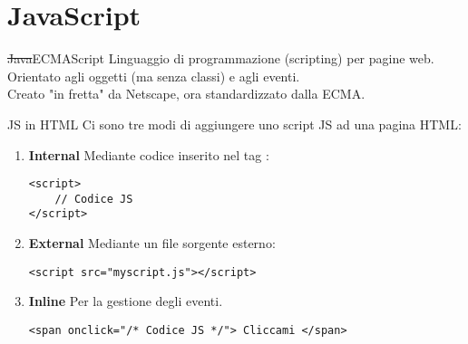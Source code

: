 \section{JavaScript}
\begin{frame}[fragile]{\sout{Java}ECMAScript}\transfade\centering
  Linguaggio di programmazione (scripting) per pagine web.\\\bigskip\pause
  Orientato agli oggetti (ma senza classi) e agli eventi.\\\bigskip\pause
  Creato "in fretta" da Netscape, ora standardizzato dalla ECMA.\\
\end{frame}

\begin{frame}[fragile]{JS in HTML}\transfade\centering
  Ci sono tre modi di aggiungere uno script JS ad una pagina HTML:
  \begin{enumerate}[<+(1)->]
    \item \textbf{Internal} Mediante codice inserito nel tag :
    \begin{verbatim}
<script>
    // Codice JS
</script>
    \end{verbatim}
    \item \textbf{External} Mediante un file sorgente esterno:
    \begin{verbatim}
<script src="myscript.js"></script>
    \end{verbatim}
    \item \textbf{Inline} Per la gestione degli eventi.
    \begin{verbatim}
<span onclick="/* Codice JS */"> Cliccami </span>
    \end{verbatim}
  \end{enumerate}
  \\
\end{frame}